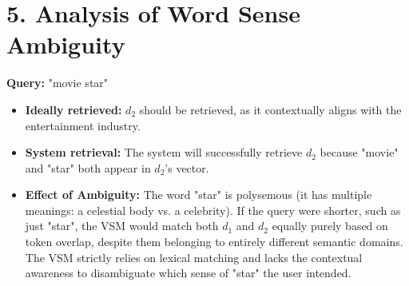 \documentclass{article}
\begin{document}
\section*{5. Analysis of Word Sense Ambiguity}
\textbf{Query:} "movie star"
\begin{itemize}
    \item \textbf{Ideally retrieved:} $d_2$ should be retrieved, as it contextually aligns with the entertainment industry. 
    \item \textbf{System retrieval:} The system will successfully retrieve $d_2$ because "movie" and "star" both appear in $d_2$'s vector.
    \item \textbf{Effect of Ambiguity:} The word "star" is polysemous (it has multiple meanings: a celestial body vs. a celebrity). If the query were shorter, such as just "star", the VSM would match both $d_1$ and $d_2$ equally purely based on token overlap, despite them belonging to entirely different semantic domains. The VSM strictly relies on lexical matching and lacks the contextual awareness to disambiguate which sense of "star" the user intended.
\end{itemize}
\end{document}
